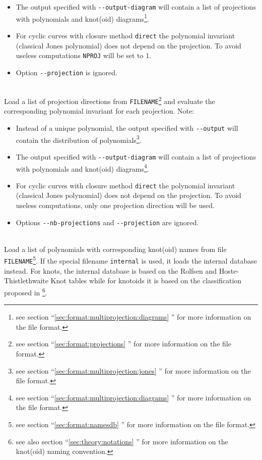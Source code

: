 \begin{description}
\begin{itemize}
    \item The output specified with \lstinline{--output-diagram} will contain a list of projections with polynomials and knot(oid) diagrams\footnote{see section ``\ref{sec:format:multiprojection:diagrams} '' for more information on the file format.}.
    \item For cyclic curves with closure method \lstinline{direct} the polynomial invariant (classical Jones polynomial) does not depend on the projection. To avoid useless computations \lstinline{NPROJ} will be set to 1.
    \item Option \lstinline{--projection} is ignored.                                  
  \end{itemize}
\item[\lstinline{--projections-list=FILENAME}]\hfill\\
  Load a list of projection directions from \lstinline{FILENAME}\footnote{see section ``\ref{sec:format:projections} '' for more information on the file format.} and evaluate the corresponding polynomial invariant for each projection. Note:
  \begin{itemize}
  \item Instead of a unique polynomial, the output specified with \lstinline{--output} will contain the distribution of polynomials\footnote{see section ``\ref{sec:format:multiprojection:jones} '' for more information on the file format.}. 
    \item The output specified with \lstinline{--output-diagram} will contain a list of projections with polynomials and knot(oid) diagrams\footnote{see section ``\ref{sec:format:multiprojection:diagrams} '' for more information on the file format.}.
    \item For cyclic curves with closure method \lstinline{direct} the polynomial invariant (classical Jones polynomial) does not depend on the projection. To avoid useless computations, only one projection direction will be used.
    \item Options  \lstinline{--nb-projections} and \lstinline{--projection} are ignored.                                  
  \end{itemize}
\item[\lstinline{-n FILENAME}, \lstinline{--names-db=FILENAME}]\hfill\\
  Load a list of polynomials with corresponding knot(oid) names from file \lstinline{FILENAME}\footnote{see section ``\ref{sec:format:namesdb} '' for more information on the file format.}. If the special filename \lstinline{internal} is used, it loads the internal database instead. For knots, the internal database is based on the Rolfsen and Hoste-Thistlethwaite Knot tables while for knotoids it is based on the classification proposed in \cite{goundaroulis2019}\footnote{see also section ``\ref{sec:theory:notations} '' for more information on the knot(oid) naming convention.}.

\end{description}
